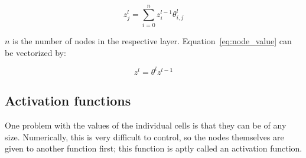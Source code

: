 \begin{equation}
    z^l_j = \sum^n_{i=0}z^{l-1}_i\theta^l_{i, j}
    \label{eq:node_value}
\end{equation}

$n$ is the number of nodes in the respective layer. Equation~\eqref{eq:node_value} can be vectorized by:

\begin{equation}
    z^l = \theta^l z^{l-1}
    \label{eq:node_value_vectorized}
\end{equation}

\subsection{Activation functions}

One problem with the values of the individual cells is that they can be of any size. Numerically, this is very difficult to control, so the nodes themselves are given to another function first; this function is aptly called an activation function.

